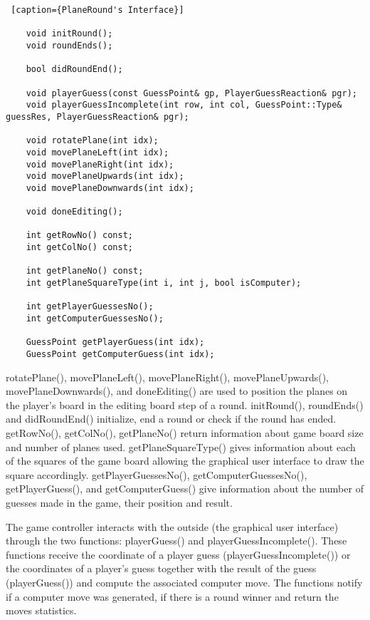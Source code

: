 \begin{lstlisting} [caption={PlaneRound's Interface}]

	void initRound();
	void roundEnds();
	
	bool didRoundEnd();
	
	void playerGuess(const GuessPoint& gp, PlayerGuessReaction& pgr);
	void playerGuessIncomplete(int row, int col, GuessPoint::Type& guessRes, PlayerGuessReaction& pgr);
	
	void rotatePlane(int idx);
	void movePlaneLeft(int idx);
	void movePlaneRight(int idx);
	void movePlaneUpwards(int idx);
	void movePlaneDownwards(int idx);
	
	void doneEditing();
	
	int getRowNo() const;
	int getColNo() const;
	
	int getPlaneNo() const;
	int getPlaneSquareType(int i, int j, bool isComputer);
	
	int getPlayerGuessesNo();
	int getComputerGuessesNo();
	
	GuessPoint getPlayerGuess(int idx);
	GuessPoint getComputerGuess(int idx);

\end{lstlisting}

rotatePlane(), movePlaneLeft(), movePlaneRight(), movePlaneUpwards(), movePlaneDownwards(), and doneEditing() are used to position the planes on the player's board in the editing board step of a round. initRound(), roundEnds() and didRoundEnd() initialize, end a round or check if the round has ended. getRowNo(), getColNo(), getPlaneNo() return information about game board size and number of planes used. getPlaneSquareType() gives information about each of the squares of the game board allowing the graphical user interface to draw the square accordingly. getPlayerGuessesNo(), getComputerGuessesNo(), getPlayerGuess(), and getComputerGuess() give information about the number of guesses made in the game, their position and result.

The game controller interacts with the outside (the graphical user interface) through the two functions: playerGuess() and playerGuessIncomplete(). These functions receive the coordinate of a player guess (playerGuessIncomplete()) or the coordinates of a player's guess together with the result of the guess (playerGuess()) and compute the associated computer move. The functions notify if a computer move was generated, if there is a round winner and return the moves statistics.


